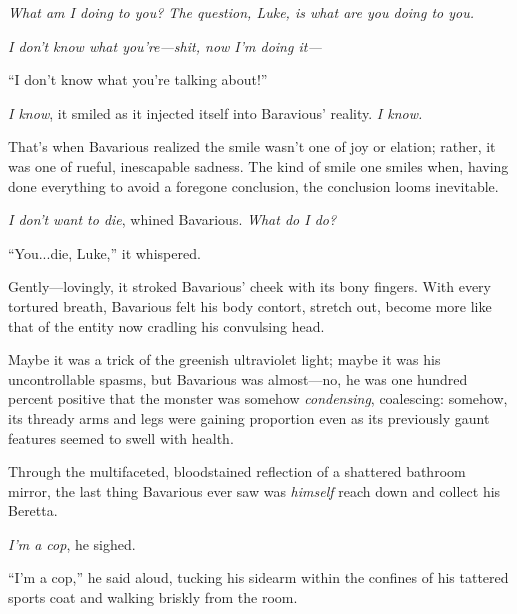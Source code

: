 {\em What am I doing to you? The question, Luke, is what are you doing
  to you.}

{\em I don't know what you're---shit, now {\em I'm} doing it---}

``I don't know what you're talking about!''

{\em I know}, it smiled as it injected itself into Baravious'
reality. {\em I know.}

That's when Bavarious realized the smile wasn't one of joy or elation;
rather, it was one of rueful, inescapable sadness. The kind of smile one
smiles when, having done everything to avoid a foregone conclusion, the
conclusion looms inevitable.

{\em I don't want to die}, whined Bavarious. {\em What do I do?}

``You...die, Luke,'' it whispered.

Gently---lovingly, it stroked Bavarious' cheek with its bony
fingers. With every tortured breath, Bavarious felt his body contort,
stretch out, become more like that of the entity now cradling his
convulsing head.

Maybe it was a trick of the greenish ultraviolet light; maybe it was his
uncontrollable spasms, but Bavarious was almost---no, he was one hundred
percent positive that the monster was somehow {\em condensing},
coalescing: somehow, its thready arms and legs were gaining proportion
even as its previously gaunt features seemed to swell with health.

Through the multifaceted, bloodstained reflection of a shattered
bathroom mirror, the last thing Bavarious ever saw was {\em himself}
reach down and collect his Beretta.

{\em I'm a cop}, he sighed.

``I'm a cop,'' he said aloud, tucking his sidearm within the confines of
his tattered sports coat and walking briskly from the room.
